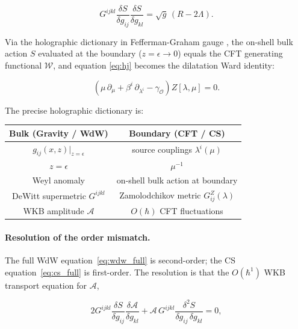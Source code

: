 \documentclass[12pt,a4paper]{article}
\begin{document}
\begin{equation}
\label{eq:hj}
G^{ijkl}\frac{\delta S}{\delta g_{ij}}\frac{\delta S}{\delta g_{kl}}
= \sqrt{g}\,(R - 2\Lambda).
\end{equation}

Via the holographic dictionary in Fefferman-Graham gauge
\cite{skenderis2002,witten1998}, the on-shell bulk action $S$ evaluated
at the boundary ($z=\epsilon\to 0$) equals the CFT generating functional
$\mathcal{W}$, and equation \eqref{eq:hj} becomes the dilatation Ward
identity:

\begin{equation}
\label{eq:cs_full}
\left(\mu\,\partial_\mu
+ \beta^i\,\partial_{\lambda^i}
- \gamma_{\mathcal{O}}\right)Z[\lambda,\mu] = 0.
\end{equation}

The precise holographic dictionary is:

\begin{center}
\renewcommand{\arraystretch}{1.4}
\begin{tabular}{|c|c|}
\hline
\textbf{Bulk (Gravity / WdW)} & \textbf{Boundary (CFT / CS)} \\
\hline
$g_{ij}(x,z)\big|_{z=\epsilon}$ & source couplings $\lambda^i(\mu)$ \\
$z = \epsilon$ & $\mu^{-1}$ \\
Weyl anomaly & on-shell bulk action at boundary \\
DeWitt supermetric $G^{ijkl}$ & Zamolodchikov metric $G^Z_{ij}(\lambda)$ \\
WKB amplitude $\mathcal{A}$ & $O(\hbar)$ CFT fluctuations \\
\hline
\end{tabular}
\end{center}

\paragraph{Resolution of the order mismatch.}
The full WdW equation~\eqref{eq:wdw_full} is second-order; the CS
equation~\eqref{eq:cs_full} is first-order.
The resolution is that the $O(\hbar^1)$ WKB transport equation for
$\mathcal{A}$,

\begin{equation}
\label{eq:transport}
2G^{ijkl}\frac{\delta S}{\delta g_{ij}}\frac{\delta\mathcal{A}}{\delta g_{kl}}
+ \mathcal{A}\,G^{ijkl}\frac{\delta^2 S}{\delta g_{ij}\,\delta g_{kl}} = 0,
\end{equation}
\end{document}
